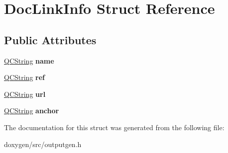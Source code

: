 \hypertarget{struct_doc_link_info}{}\section{Doc\+Link\+Info Struct Reference}
\label{struct_doc_link_info}
\subsection*{Public Attributes}
\begin{DoxyCompactItemize}
\item 
\mbox{\label{struct_doc_link_info_a92c73ddcfa2201e6b0029f4b4e64458b}} 
\mbox{\hyperlink{class_q_c_string}{Q\+C\+String}} {\bfseries name}
\item 
\mbox{\label{struct_doc_link_info_abe4bbcd9b1709f58b0b29a9020c42e42}} 
\mbox{\hyperlink{class_q_c_string}{Q\+C\+String}} {\bfseries ref}
\item 
\mbox{\label{struct_doc_link_info_a7607f6298e3e16dd3ef26d2f823bbb9c}} 
\mbox{\hyperlink{class_q_c_string}{Q\+C\+String}} {\bfseries url}
\item 
\mbox{\label{struct_doc_link_info_a2827af934ddee422d0f8711c9889f5e8}} 
\mbox{\hyperlink{class_q_c_string}{Q\+C\+String}} {\bfseries anchor}
\end{DoxyCompactItemize}


The documentation for this struct was generated from the following file\+:\begin{DoxyCompactItemize}
\item 
doxygen/src/outputgen.\+h\end{DoxyCompactItemize}
